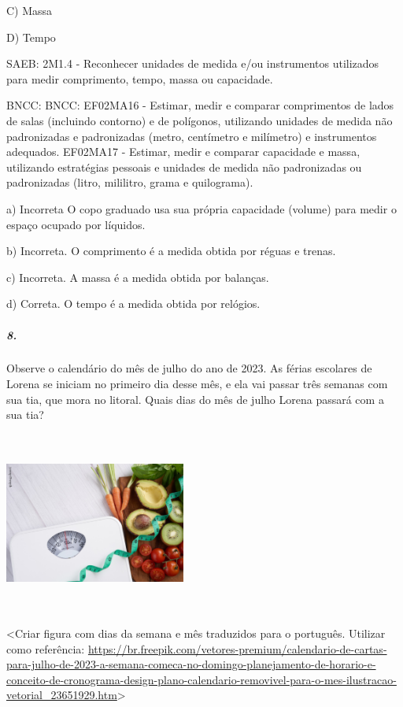 C) Massa

D) Tempo

SAEB: 2M1.4 - Reconhecer unidades de medida e/ou instrumentos utilizados
para medir comprimento, tempo, massa ou capacidade.

BNCC: BNCC: EF02MA16 - Estimar, medir e comparar comprimentos de lados
de salas (incluindo contorno) e de polígonos, utilizando unidades de
medida não padronizadas e padronizadas (metro, centímetro e milímetro) e
instrumentos adequados. EF02MA17 - Estimar, medir e comparar capacidade
e massa, utilizando estratégias pessoais e unidades de medida não
padronizadas ou padronizadas (litro, mililitro, grama e quilograma).

a) Incorreta O copo graduado usa sua própria capacidade (volume) para
medir o espaço ocupado por líquidos.

b) Incorreta. O comprimento é a medida obtida por réguas e trenas.

c) Incorreta. A massa é a medida obtida por balanças.

d) Correta. O tempo é a medida obtida por relógios.

\subparagraph{8. }\label{section-122}

Observe o calendário do mês de julho do ano de 2023. As férias escolares
de Lorena se iniciam no primeiro dia desse mês, e ela vai passar três
semanas com sua tia, que mora no litoral. Quais dias do mês de julho
Lorena passará com a sua tia?

\includegraphics[width=2.34444in,height=2.34933in]{media/image137.png}

\textless{}Criar figura com dias da semana e mês traduzidos para o
português. Utilizar como referência:
\url{https://br.freepik.com/vetores-premium/calendario-de-cartas-para-julho-de-2023-a-semana-comeca-no-domingo-planejamento-de-horario-e-conceito-de-cronograma-design-plano-calendario-removivel-para-o-mes-ilustracao-vetorial_23651929.htm}\textgreater{}


